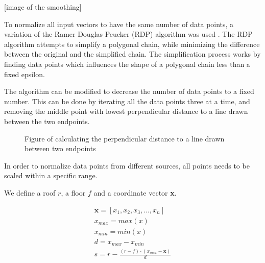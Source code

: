 [image of the smoothing]


To normalize all input vectors to have the same number of data points, a variation of the Ramer Douglas Peucker (RDP)\cite{ramer_douglas_peucker} algorithm was used . The RDP algorithm attempts to simplify a polygonal chain, while minimizing the difference between the original and the  simplified chain. The simplification process works by finding data points which influences the shape of a polygonal chain less than a fixed epsilon. 

The algorithm can be modified to decrease the number of data points to a fixed number. This can be done by iterating all the data points three at a time, and removing the middle point with lowest perpendicular distance to a line drawn between the two endpoints.

\begin{figure}
    \centering
    \caption{Figure of calculating the perpendicular distance to a line drawn between two endpoints}
    \label{fig:my_label}
\end{figure}
\label{ramer_douglas_peucker}



In order to normalize data points from different sources, all points needs to be scaled within a specific range. 

We define a roof $r$, a floor $f$ and a coordinate vector \textbf{x}.

\begin{equation} \label{eqn:scale_linear_by_column}
\begin{split}
    \textbf{x} = [x_1, x_2, x_3, \dots, x_n] \\
    x_{max} = max(x) \\
    x_{min} = min(x) \\
    d = x_{max} - x_{min} \\
    s = r - \frac{(r - f) \cdot (x_{max} - \textbf{x})}{d}
\end{split}
\end{equation}


